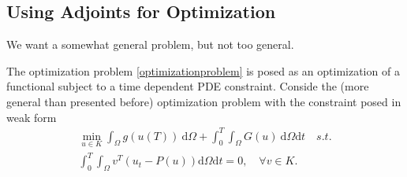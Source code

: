 \documentclass[10pt]{article}
\renewcommand{\d}{\mathrm{d}}
\begin{document}
\subsection{Using Adjoints for Optimization}

We want a somewhat general problem, but not too general.

The optimization problem \ref{optimizationproblem} is posed as an optimization of a functional subject to a time dependent PDE constraint.
Conside the (more general than presented before)
optimization problem with the constraint posed in weak form
\begin{eqnarray}
  \min_{u \in K} \int_{\Omega}g(u(T)) \ \d \Omega + \int_0^T\int_{\Omega}G(u) \ \d \Omega \d t \quad s.t. \\ \nonumber
  \int_0^T \int_{\Omega} v^T( u_t- P( u))  \d \Omega \d t = 0, \quad \forall v \in K.
\label{newoptimizationproblem}
\end{eqnarray}
\end{document}
